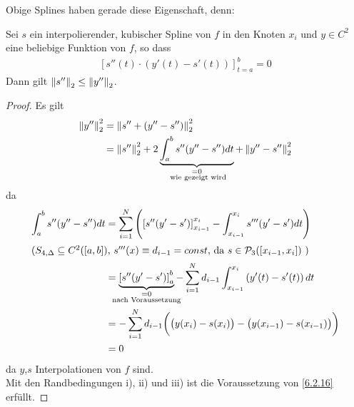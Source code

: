 Obige Splines haben gerade diese Eigenschaft, denn:

\begin{Satze}\label{6.2.16}
  Sei $s$ ein interpolierender, kubischer Spline von $f$
  in den Knoten $x_i $ und $y\in C^2$ eine beliebige Funktion
  von $f$, so dass 
  \begin{gather*}
    \left[s''(t)\cdot(y'(t)-s'(t))\right]_{t=a}^{b}=0
  \end{gather*}
  Dann gilt $\left\| s'' \right\|_2 \leq \left\| y'' \right\|_2$.

  \begin{proof}
    Es gilt
    \begin{align*}
      \nn{y''}_2^2 &= \nn{s''+(y''-s'')}_2^2\\
                   &= \nn{s''}_2^2
                     + 2\underbrace{\int_{a}^{b}s''(y''-s'')dt}_{
                     \mathclap{\substack{=0 \\ \text{ wie gezeigt wird}}}
      }
      + \nn{y''-s''}_2^2
    \end{align*}
    da
    \begin{align*}
      \int_{a}^{b} s''(y''-s'')dt &= \sum_{i=1}^{N}\left(\left[
                                    s''(y'-s')\right]_{x_{i-1}}^{x_i}
                                    -\int_{x_{i-1}}^{x_i}s'''(y'-s')dt\right)\\
      \intertext{($S_{4,\Delta}\subseteq C^2([a,b])$, 
      $s'''(x)\equiv d_{i-1}=const$, 
      da 
      $s\in\p_3([x_{i-1},x_i])$ )
      }
                                  &= \underbrace{\left[ s''(y'-s')\right]_{a}^{b}}_{
                                    \mathclap{\substack{ =0 \\ \text{ nach Voraussetzung } }}
      }
      -\sum_{i=1}^{N} d_{i-1}
      \int_{x_{i-1}}^{x_i} \left(y'(t)-s'(t)\right) dt\\
                                  &=-\sum_{i=1}^N d_{i-1}\bigg(\big(y(x_i)-s(x_i)\big)
                                    - \big(y(x_{i-1})-s(x_{i-1})\big)\bigg) \\
                                  &=0
    \end{align*}
    da $y$,$s$ Interpolationen von $f$ sind.\\
    Mit den Randbedingungen i), ii) und iii) 
    ist die Voraussetzung von \ref{6.2.16} erfüllt.
  \end{proof}
\end{Satze}


